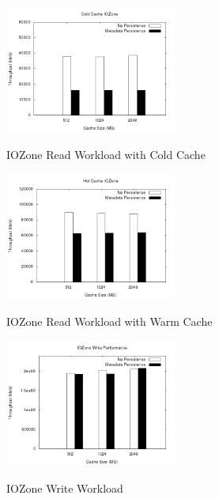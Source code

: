 \graphicspath{{../Results/}}

\begin{figure}[t]
  \caption{IOZone Read Workload with Cold Cache}
  \centering \includegraphics[width=0.5\textwidth]{results_first.png}
  \label{fig:iozone-cold}
\end{figure}

\begin{figure}[t]
  \caption{IOZone Read Workload with Warm Cache}
  \centering \includegraphics[width=0.5\textwidth]{results_second.png}
  \label{fig:iozone-warm}
\end{figure}

\begin{figure}[t]
  \caption{IOZone Write Workload}
  \centering \includegraphics[width=0.5\textwidth]{results_write.png}
  \label{fig:iozone-write}
\end{figure}

